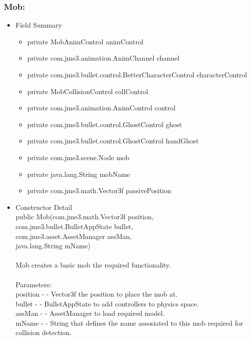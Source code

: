 \documentclass[letterpaper]{article}
\begin{document}
				\subsubsection*{Mob:}
				\vspace{0.1in}
					\begin{itemize}
						\item	Field Summary
								\begin{itemize}
									\item	private MobAnimControl	animControl 
									\item	private com.jme3.animation.AnimChannel	channel 
									\item	private com.jme3.bullet.control.BetterCharacterControl	characterControl 
									\item	private MobCollisionControl	collControl 
									\item	private com.jme3.animation.AnimControl	control 
									\item	private com.jme3.bullet.control.GhostControl	ghost 
									\item	private com.jme3.bullet.control.GhostControl	handGhost 
									\item	private com.jme3.scene.Node	mob 
									\item	private java.lang.String	mobName 
									\item	private com.jme3.math.Vector3f	passivePosition
								\end{itemize}
						\item	Constructor Detail \\
								public Mob(com.jme3.math.Vector3f position, \\
  com.jme3.bullet.BulletAppState bullet, \\
  com.jme3.asset.AssetManager assMan, \\
  java.lang.String mName) \\ \\ 
								Mob creates a basic mob the required functionality. \\ \\
								Parameters: \\
								position - - Vector3f the position to place the mob at. \\
								bullet - - BulletAppState to add controllers to physics space. \\
								assMan - - AssetManager to load required model. \\
								mName - - String that defines the name assosiated to this mob required for collision detection.

\end{itemize}
\end{document}
